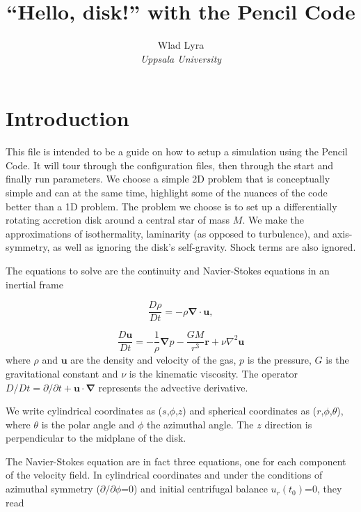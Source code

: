 \documentclass[a4paper,10pt]{article}
\newcommand{\pencilcode}{{\sc Pencil Code}}
\newcommand{\aderiv}[1]{\frac{D #1}{Dt}}
\renewcommand{\v}[1]{{\boldsymbol #1}} %
\newcommand{\del}{\v{\nabla}}
\newcommand{\grad}{\del}
\newcommand{\Div}{\v{\nabla}\cdot}
\newcommand{\Laplace}{\nabla^2}
\begin{document}
\date{}


\title{{\bf ``Hello, disk!'' with the \pencilcode}}


\author{Wlad Lyra\\
{\it Uppsala University}}               
\date{}  

\maketitle


\section{Introduction}

This file is intended to be a guide on how to setup a simulation using the \pencilcode. It will tour through the configuration files, then through the start and finally run parameters. We choose a simple 2D problem that is conceptually simple and can at the same time, highlight some of the nuances of the code better than a 1D problem. The problem we choose is to set up a differentially rotating accretion disk around a central star of mass $M$. We make the approximations of isothermality, laminarity (as opposed to turbulence), and axis-symmetry, as well as ignoring the disk's self-gravity. Shock terms are also ignored. 

The equations to solve are the continuity and Navier-Stokes equations in an inertial frame

\begin{equation}
\label{continuity}
  \aderiv{\rho} = -\rho{\Div\v{u}}, 
\end{equation}

\begin{equation}
\label{navier-stokes}
  \aderiv{\v{u}} = -\frac{1}{\rho}\grad{p} - \frac{GM}{r^3}\v{r} + \nu\Laplace{\v{u}}
\end{equation}where $\rho$ and $\v{u}$ are the density and velocity of the gas, $p$ is the pressure, $G$ is the gravitational constant and $\nu$ is the kinematic viscosity. The operator ${D}/Dt = \partial /{\partial}t + \v{u}\cdot\del$ represents the advective derivative.

We write cylindrical coordinates as ($s$,$\phi$,$z$) and spherical coordinates as ($r$,$\phi$,$\theta$), where $\theta$ is the polar angle and $\phi$ the azimuthal angle. The $z$ direction is perpendicular to the midplane of the disk.

The Navier-Stokes equation are in fact three equations, one for each component of the velocity field. In cylindrical coordinates and under the conditions of azimuthal symmetry ($\partial /{\partial}\phi$=0) and initial centrifugal balance $u_{r}(t_0)$=0, they read
\end{document}
